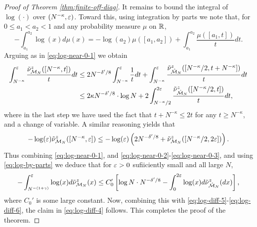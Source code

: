 \documentclass{amsart}
\numberwithin{equation}{section}
\def\corAB{}
\begin{document}
\begin{proof}[Proof of Theorem \ref{thm:finite-off-diag}]
It remains to bound the integral of $\log(\cdot)$ over $(N^{-\kappa}, \varepsilon)$.
Toward this,
using integration by parts we note that, for $0 \le a_1 < a_2  <1$ and any probability measure $\mu$ on $\mathbb{R}$,
\begin{equation}\label{eq:log-by-parts}
-\int_{a_1}^{a_2} \log (x) d\mu(x) = -\log(a_2) \mu([a_1,a_2]) + \int_{a_1}^{a_2} \frac{\mu([a_1,t])}{t} dt.
\end{equation}
Arguing as in \eqref{eq:log-near-0-1} we obtain
\begin{align}
\int_{N^{-\kappa}}^\varepsilon \frac{\tilde
  \nu_{\mathcal{M}_N}^z([N^{-\kappa}, t])}{t} dt& \le 2N^{- \delta' /8}
  \int_{N^{-\kappa}}^\varepsilon \frac{1}{t} dt +
  \int_{N^{-\kappa}}^\varepsilon \frac{\tilde \nu_{\hat{\mathcal{M}}_N}^z([N^{-\kappa}/2, t+N^{-\kappa}])}{t} dt \notag\\
& \le 2\kappa N^{-\delta' /8} \cdot \log N +2 \int_{N^{-\kappa}/2}^{2\varepsilon} \frac{\tilde \nu_{\hat{\mathcal{M}}_N}^z([N^{-\kappa}/2, t])}{t} dt,  \label{eq:log-near-0-2}
\end{align}
where in the last step we have used the fact that $t + N^{-\kappa} \le 2t$ for any $t \ge N^{-\kappa}$, and a change of variable. A similar reasoning yields that
\begin{equation}
-\log(\vep) \tilde \nu_{\model_N}^z([N^{-\kappa},\vep]) \le - \log(\vep) \left( \corAB{2 N^{-\delta'/8}} +
\tilde \nu_{\model_N}^z([N^{-\kappa}/2,2\vep])\right). \label{eq:log-near-0-3}
\end{equation}
Thus combining \eqref{eq:log-near-0-1}, and \eqref{eq:log-near-0-2}-\eqref{eq:log-near-0-3}, and using \eqref{eq:log-by-parts} we deduce that for $\varepsilon >0$ sufiiciently small and all large $N$,
\[
-\int_{N^{-(1+\gamma)}}^{\varepsilon} \log (x) d\tilde
\nu_{\mathcal{M}_N}^z(x)  \le C_0' \left[ \log N \cdot N^{- \delta'/8}-\int_0^{2\varepsilon}\log(x) d\tilde \nu_{\hat{\mathcal{M}}_N}^z(dx)\right],
\]
where $C_0'$ is some large constant. Now, combining this with
\eqref{eq:log-diff-5}-\eqref{eq:log-diff-6}, the claim in \eqref{eq:log-diff-4} follows. This completes the proof of the theorem.
\end{proof}
\end{document}

